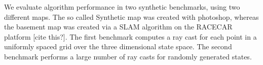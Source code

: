 \documentclass[letterpaper, 10 pt, conference]{ieeeconf}  %
\newcommand{\img}[1]{\begin{center}\texttt{[image: \{\#1]}}\end{center}}
\begin{document}




We evaluate algorithm performance in two synthetic benchmarks, using two different maps. The so called Synthetic map was created with photoshop, whereas the basement map was created via a SLAM algorithm on the RACECAR platform [cite this?]. The first benchmark computes a ray cast for each point in a uniformly spaced grid over the three dimensional state space. The second benchmark performs a large number of ray casts for randomly generated states.
\end{document}
